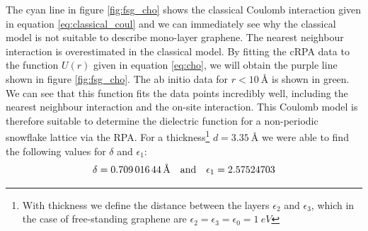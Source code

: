 The cyan line in figure \ref{fig:fsg_cho} shows the classical Coulomb interaction given in equation \ref{eq:classical_coul} and we can immediately see why the classical model is not suitable to describe mono-layer graphene. The nearest neighbour interaction is overestimated in the classical model. By fitting the cRPA data to the function $U(r)$ given in equation \ref{eq:cho}, we will obtain the purple line shown in figure \ref{fig:fsg_cho}. The ab initio data for $r<\SI{10}{\angstrom}$ is shown in green. We can see that this function fits the data points incredibly well, including the nearest neighbour interaction and the on-site interaction. This Coulomb model is therefore suitable to determine the dielectric function for a non-periodic snowflake lattice via the RPA. For a thickness\footnote{With thickness we define the distance between the layers $\epsilon_2$ and $\epsilon_3$, which in the case of free-standing graphene are $\epsilon_2=\epsilon_3 =\epsilon_0=\SI{1}{eV}$} $d = \SI{3.35}{\angstrom}$ we were able to find the following values for $\delta$ and $\epsilon_1$:
\begin{equation}\label{eq:params_FSG}
    \delta = \SI{0.70901644}{\angstrom} \quad \mathrm{and} \quad \epsilon_1= 2.57524703
\end{equation}

